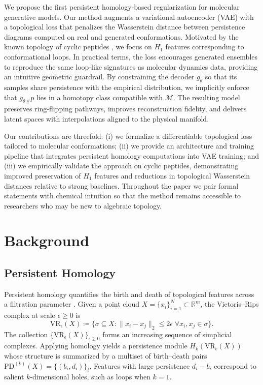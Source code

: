 \documentclass[11pt]{article}
\begin{document}
We propose the first persistent homology-based regularization for molecular generative models. Our method augments a variational autoencoder (VAE) with a topological loss that penalizes the Wasserstein distance between persistence diagrams computed on real and generated conformations. Motivated by the known topology of cyclic peptides \cite{wales2001microscopic, shaw2010atomic}, we focus on $H_1$ features corresponding to conformational loops. In practical terms, the loss encourages generated ensembles to reproduce the same loop-like signatures as molecular dynamics data, providing an intuitive geometric guardrail. By constraining the decoder $g_\theta$ so that its samples share persistence with the empirical distribution, we implicitly enforce that $g_{\theta\,\#}p$ lies in a homotopy class compatible with $\mathcal{M}$. The resulting model preserves ring-flipping pathways, improves reconstruction fidelity, and delivers latent spaces with interpolations aligned to the physical manifold.

Our contributions are threefold: (i) we formalize a differentiable topological loss tailored to molecular conformations; (ii) we provide an architecture and training pipeline that integrates persistent homology computations into VAE training; and (iii) we empirically validate the approach on cyclic peptides, demonstrating improved preservation of $H_1$ features and reductions in topological Wasserstein distances relative to strong baselines. Throughout the paper we pair formal statements with chemical intuition so that the method remains accessible to researchers who may be new to algebraic topology.

\section{Background}
\subsection{Persistent Homology}
Persistent homology quantifies the birth and death of topological features across a filtration parameter \cite{edelsbrunner2010computational, carlsson2009topology}. Given a point cloud $X = \{x_i\}_{i=1}^N \subset \mathbb{R}^m$, the Vietoris--Rips complex at scale $\epsilon \geq 0$ is
\begin{equation}
    \mathrm{VR}_\epsilon(X) \coloneqq \big\{ \sigma \subseteq X : \|x_i - x_j\|_2 \leq 2\epsilon \; \forall x_i, x_j \in \sigma \big\}.
    \label{eq:vietoris-rips}
\end{equation}
The collection $\big\{ \mathrm{VR}_\epsilon(X) \big\}_{\epsilon \geq 0}$ forms an increasing sequence of simplicial complexes. Applying homology yields a persistence module $H_k(\mathrm{VR}_\epsilon(X))$ whose structure is summarized by a multiset of birth--death pairs $\mathrm{PD}^{(k)}(X) = \{(b_i, d_i)\}_{i}$. Features with large persistence $d_i - b_i$ correspond to salient $k$-dimensional holes, such as loops when $k=1$.
\end{document}
